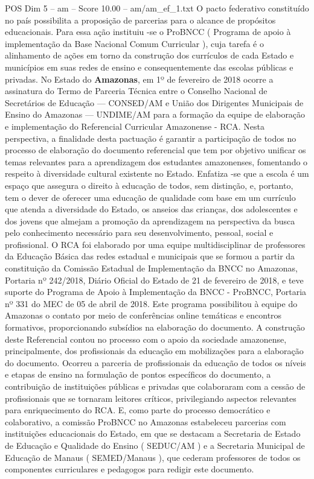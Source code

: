 \begin{textsample}{POS Dim 5 – am – Score 10.00 – am/am\_ef\_1.txt}
O pacto federativo constituído no país possibilita a proposição de parcerias para o alcance de propósitos educacionais.
Para essa ação instituiu -se o ProBNCC ( Programa de apoio à implementação da Base Nacional Comum Curricular ), cuja tarefa é o alinhamento de ações em torno da construção dos currículos de cada Estado e municípios em suas redes de ensino e consequentemente das escolas públicas e privadas.
No Estado do \textbf{Amazonas}, em 1º de fevereiro de 2018 ocorre a assinatura do Termo de Parceria Técnica entre o Conselho Nacional de Secretários de Educação — CONSED/AM e União dos Dirigentes Municipais de Ensino do Amazonas — UNDIME/AM para a formação da equipe de elaboração e implementação do Referencial Curricular Amazonense - RCA.
Nesta perspectiva, a finalidade desta pactuação é garantir a participação de todos no processo de elaboração do documento referencial que tem por objetivo unificar os temas relevantes para a aprendizagem dos estudantes amazonenses, fomentando o respeito à diversidade cultural existente no Estado.
Enfatiza -se que a escola é um espaço que assegura o direito à educação de todos, sem distinção, e, portanto, tem o dever de oferecer uma educação de qualidade com base em um currículo que atenda a diversidade do Estado, os anseios das crianças, dos adolescentes e dos jovens que almejam a promoção da aprendizagem na perspectiva da busca pelo conhecimento necessário para seu desenvolvimento, pessoal, social e profissional.
O RCA foi elaborado por uma equipe multidisciplinar de professores da Educação Básica das redes estadual e municipais que se formou a partir da constituição da Comissão Estadual de Implementação da BNCC no Amazonas, Portaria nº 242/2018, Diário Oficial do Estado de 21 de fevereiro de 2018, e teve suporte do Programa de Apoio à Implementação da BNCC - ProBNCC, Portaria nº 331 do MEC de 05 de abril de 2018.
Este programa possibilitou à equipe do Amazonas o contato por meio de conferências online temáticas e encontros formativos, proporcionando subsídios na elaboração do documento.
A construção deste Referencial contou no processo com o apoio da sociedade amazonense, principalmente, dos profissionais da educação em mobilizações para a elaboração do documento.
Ocorreu a parceria de profissionais da educação de todos os níveis e etapas de ensino na formulação de pontos específicos do documento, a contribuição de instituições públicas e privadas que colaboraram com a cessão de profissionais que se tornaram leitores críticos, privilegiando aspectos relevantes para enriquecimento do RCA.
E, como parte do processo democrático e colaborativo, a comissão ProBNCC no Amazonas estabeleceu parcerias com instituições educacionais do Estado, em que se destacam a Secretaria de Estado de Educação e Qualidade do Ensino ( SEDUC/AM ) e a Secretaria Municipal de Educação de Manaus ( SEMED/Manaus ), que cederam professores de todos os componentes curriculares e pedagogos para redigir este documento.

\end{textsample}
